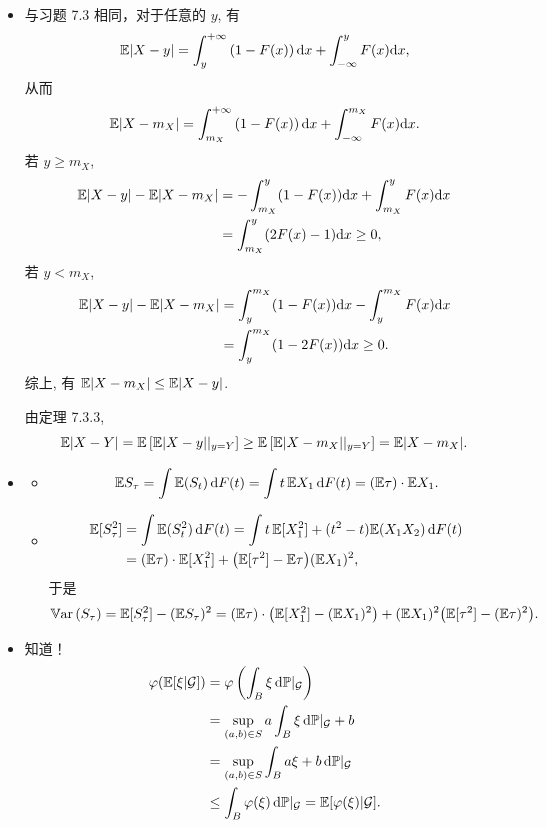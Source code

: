 \begin{itemize}
    \item[7.5]
    与习题 7.3 相同，对于任意的 $y$, 有
    $$ \mathbb{E}|X-y| = \int_y^{+\infty} \left( 1 - F(x) \right) \mathrm dx + \int_{-\infty}^y F(x) \mathrm dx, $$
    从而
    $$ \mathbb{E}| X-m_X | = \int_{m_X}^{+\infty} \left( 1 - F(x) \right) \mathrm dx + \int_{-\infty}^{m_X} F(x) \mathrm dx. $$
    若 $y \ge m_X$,
    \begin{align*}
        \mathbb{E}|X-y| - \mathbb{E}| X-m_X | &= -\int_{m_X}^y (1 - F(x)) \mathrm dx + \int_{m_X}^y F(x) \mathrm dx \\
        &= \int_{m_X}^y (2F(x) - 1) \mathrm dx \ge 0,
    \end{align*}
    若 $y < m_X$,
    \begin{align*}
        \mathbb{E}|X-y| - \mathbb{E}| X-m_X | &= \int_y^{m_X} (1 - F(x)) \mathrm dx - \int_y^{m_X} F(x) \mathrm dx \\
        &= \int_y^{m_X} (1 - 2F(x)) \mathrm dx \ge 0.
    \end{align*}
    综上, 有 $\mathbb{E}| X-m_X | \le \mathbb{E}|X-y|$.

    由定理 7.3.3,
    $$ \mathbb{E}|X-Y| = \mathbb{E}\left[ \mathbb{E}|X-y| \middle| _{y=Y} \right] \ge \mathbb{E}\left[ \mathbb{E}| X-m_X | \middle| _{y=Y} \right] = \mathbb{E}| X-m_X | .$$

    \item[7.12]
    \begin{itemize}
    \item[(1)] $$\mathbb{E} S_\tau=\int\mathbb{E}(S_t)\,{\rm d}F(t)
    =\int t\,\mathbb{E} X_1\,{\rm d}F(t)=(\mathbb{E}\tau)\cdot\mathbb{E} X_1.$$
    \item[(2)] \begin{align*}
        \mathbb{E}[S_\tau^2]&=\int\mathbb{E}(S_t^2)\,{\rm d}F(t)
        =\int t\,\mathbb{E}[X_1^2]+(t^2-t)\mathbb{E}(X_1X_2)\,{\rm d}F(t)\\
        &=(\mathbb{E}\tau)\cdot\mathbb{E}[X_1^2]+\big(\mathbb{E}[\tau^2]-\mathbb{E}\tau\big)(\mathbb{E} X_1)^2,
    \end{align*}
    于是$$\mathbb{V}\mathrm{ar}\,(S_\tau)=\mathbb{E}[S_\tau^2]-(\mathbb{E} S_\tau)^2
    =(\mathbb{E}\tau)\cdot\big(\mathbb{E}[X_1^2]-(\mathbb{E} X_1)^2\big)
    +(\mathbb{E} X_1)^2\big(\mathbb{E}[\tau^2]-(\mathbb{E}\tau)^2\big).$$
    \end{itemize}

    \item[7.23]
    知道！
    \begin{align*}\varphi(\mathbb{E}[\xi|\mathcal{G}])&=\varphi\left(\int_B\xi\,{\rm d}\mathbb{P}|_{\mathcal{G}}\right)\\
    &=\sup_{(a,b)\in S}a\int_B\xi\,{\rm d}\mathbb{P}|_{\mathcal{G}}+b\\
    &=\sup_{(a,b)\in S}\int_Ba\xi+b\,{\rm d}\mathbb{P}|_{\mathcal{G}}\\
    &\le\int_B\varphi(\xi)\,{\rm d}\mathbb{P}|_{\mathcal{G}}=\mathbb{E}[\varphi(\xi)|\mathcal{G}].\end{align*}
\end{itemize}

